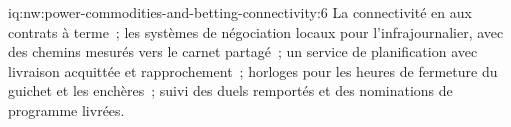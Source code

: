 \begin{solution}{iq:nw:power-commodities-and-betting-connectivity:6}
La connectivité en  aux contrats à terme~; les systèmes de négociation locaux pour l'infrajournalier, avec des chemins mesurés vers le carnet partagé~; un service de planification avec
livraison acquittée et rapprochement~; horloges pour les heures de fermeture du guichet et les enchères~; suivi des duels remportés et des nominations de programme livrées.
\end{solution}
